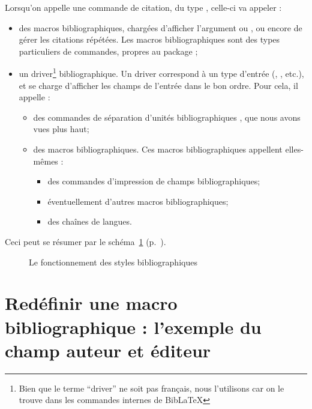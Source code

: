 Lorsqu'on appelle une commande de citation, du type , celle-ci va appeler :
    \begin{itemize}
        \item des macros bibliographiques, chargées d'afficher l'argument  ou , ou encore de gérer les citations répétées. Les macros bibliographiques sont des types particuliers de commandes, propres au package ;\label{macrobiblio} 
        \item un driver\footnote{Bien que le terme \enquote{driver} ne soit pas français, nous l'utilisons car on le trouve dans les commandes internes de BibLaTeX} bibliographique. Un driver correspond à un type d'entrée (, , etc.), et se charge d'afficher les champs de l'entrée dans le bon ordre. Pour cela, il appelle :
        \begin{itemize}
            \item des commandes de séparation d'unités bibliographiques
, que nous avons vues plus haut;
            \item des macros bibliographiques. Ces macros bibliographiques appellent elles-mêmes :
            \begin{itemize}
                \item des commandes d'impression de champs bibliographiques;
                \item éventuellement d'autres macros bibliographiques;
                \item des chaînes de langues.
            \end{itemize}
        \end{itemize}
        
    \end{itemize}

Ceci peut se résumer par le schéma~\ref{schemastylesbiblios} (p.~\pageref{schemastylesbiblios}). 

\begin{figure}[!]

\caption{Le fonctionnement des styles bibliographiques}\label{schemastylesbiblios}
\end{figure}



\section[Redéfinir une macro bibliographique]{Redéfinir une macro bibliographique : l'exemple du champ auteur et éditeur}


